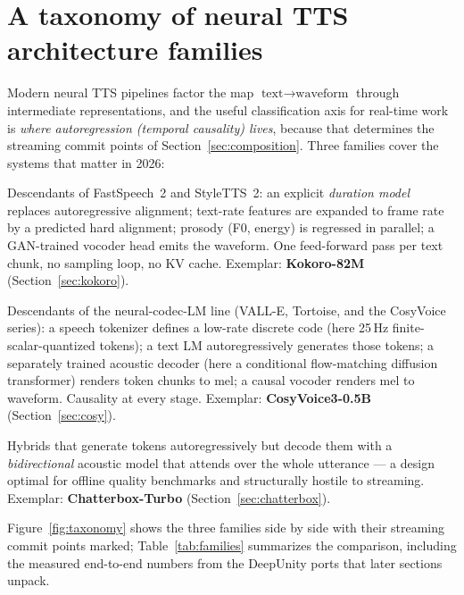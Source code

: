 \documentclass[11pt,a4paper]{article}
\begin{document}
\section{A taxonomy of neural TTS architecture families}
\label{sec:taxonomy}

Modern neural TTS pipelines factor the map
$\text{text} \rightarrow \text{waveform}$ through intermediate representations, and the
useful classification axis for real-time work is \emph{where autoregression (temporal
causality) lives}, because that determines the streaming commit points of
Section~\ref{sec:composition}. Three families cover the systems that matter in 2026:

\begin{description}[leftmargin=2em, style=nextline]
\item[Family A --- Non-autoregressive parallel pipelines.] Descendants of
FastSpeech~2 and StyleTTS~2: an explicit \emph{duration model} replaces autoregressive
alignment; text-rate features are expanded to frame rate by a predicted hard alignment;
prosody (F0, energy) is regressed in parallel; a GAN-trained vocoder head emits the
waveform. One feed-forward pass per text chunk, no sampling loop, no KV cache. Exemplar:
\textbf{Kokoro-82M} (Section~\ref{sec:kokoro}).
\item[Family B --- Autoregressive discrete-token two-stage systems.] Descendants of the
neural-codec-LM line (VALL-E, Tortoise, and the CosyVoice series): a speech tokenizer
defines a low-rate discrete code (here 25\,Hz finite-scalar-quantized tokens); a text LM
autoregressively generates those tokens; a separately trained acoustic decoder
(here a conditional flow-matching diffusion transformer) renders token chunks to mel; a
causal vocoder renders mel to waveform. Causality at every stage. Exemplar:
\textbf{CosyVoice3-0.5B} (Section~\ref{sec:cosy}).
\item[Family C --- AR front-end with offline acoustic decoder.] Hybrids that generate
tokens autoregressively but decode them with a \emph{bidirectional} acoustic model that
attends over the whole utterance --- a design optimal for offline quality benchmarks and
structurally hostile to streaming. Exemplar: \textbf{Chatterbox-Turbo}
(Section~\ref{sec:chatterbox}).
\end{description}

Figure~\ref{fig:taxonomy} shows the three families side by side with their streaming
commit points marked; Table~\ref{tab:families} summarizes the comparison, including the
measured end-to-end numbers from the DeepUnity ports that later sections unpack.
\end{document}
